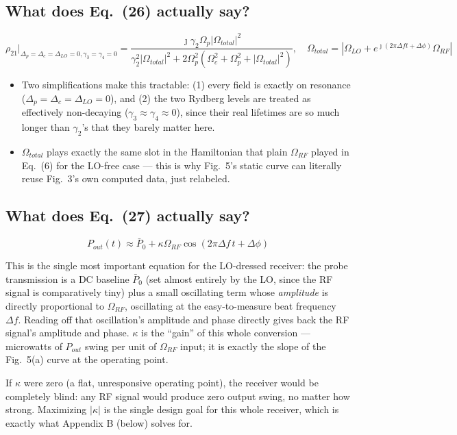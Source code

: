 \documentclass[11pt]{article}
\begin{document}
\subsection*{What does Eq.~(26) actually say?}
\[
\rho_{21}\big|_{\Delta_p=\Delta_c=\Delta_{LO}=0,\gamma_3=\gamma_4=0} = \frac{\jmath\gamma_2\Omega_p|\Omega_{total}|^2}{\gamma_2^2|\Omega_{total}|^2+2\Omega_p^2(\Omega_c^2+\Omega_p^2+|\Omega_{total}|^2)}, \quad \Omega_{total}=\left|\Omega_{LO}+e^{\jmath(2\pi\Delta ft+\Delta\phi)}\Omega_{RF}\right|
\]
\begin{itemize}
\item Two simplifications make this tractable: (1) every field is exactly on resonance ($\Delta_p=\Delta_c=\Delta_{LO}=0$), and (2) the two Rydberg levels are treated as effectively non-decaying ($\gamma_3\approx\gamma_4\approx0$), since their real lifetimes are so much longer than $\gamma_2$'s that they barely matter here.
\item $\Omega_{total}$ plays exactly the same slot in the Hamiltonian that plain $\Omega_{RF}$ played in Eq.~(6) for the LO-free case --- this is why Fig.~5's static curve can literally reuse Fig.~3's own computed data, just relabeled.
\end{itemize}

\subsection*{What does Eq.~(27) actually say?}
\[
P_{out}(t) \approx \bar P_0 + \kappa\Omega_{RF}\cos(2\pi\Delta f\,t+\Delta\phi)
\]
\begin{eqmeaning}
This is the single most important equation for the LO-dressed receiver: the probe transmission is a DC baseline $\bar P_0$ (set almost entirely by the LO, since the RF signal is comparatively tiny) plus a small oscillating term whose \emph{amplitude} is directly proportional to $\Omega_{RF}$, oscillating at the easy-to-measure beat frequency $\Delta f$. Reading off that oscillation's amplitude and phase directly gives back the RF signal's amplitude and phase. $\kappa$ is the ``gain'' of this whole conversion --- microwatts of $P_{out}$ swing per unit of $\Omega_{RF}$ input; it is exactly the slope of the Fig.~5(a) curve at the operating point.
\end{eqmeaning}
\begin{ifnot}
If $\kappa$ were zero (a flat, unresponsive operating point), the receiver would be completely blind: any RF signal would produce zero output swing, no matter how strong. Maximizing $|\kappa|$ is the single design goal for this whole receiver, which is exactly what Appendix B (below) solves for.
\end{ifnot}
\end{document}

